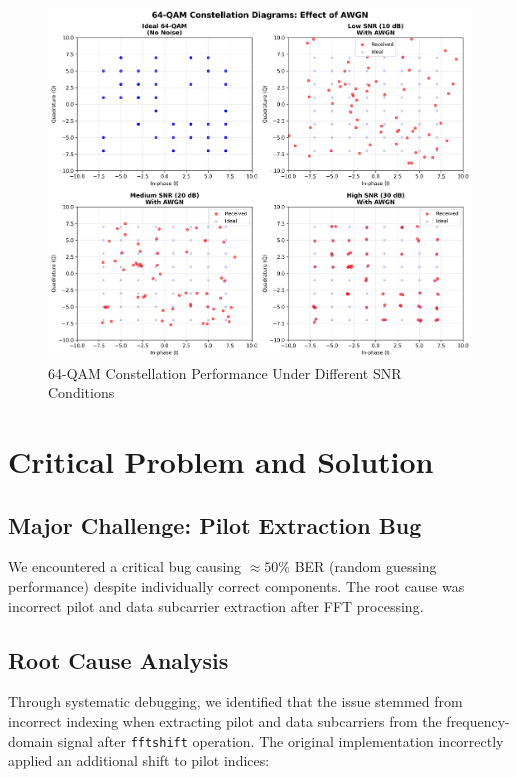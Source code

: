 \documentclass[11pt,a4paper]{article}
\begin{document}
\begin{figure}[H]
    \centering
    \includegraphics[width=\textwidth]{constellation_comparison.png}
    \caption{64-QAM Constellation Performance Under Different SNR Conditions}
    \label{fig:constellation_comparison}
\end{figure}

\section{Critical Problem and Solution}

\subsection{Major Challenge: Pilot Extraction Bug}
We encountered a critical bug causing $\approx 50\%$ BER (random guessing performance) despite individually correct components. The root cause was incorrect pilot and data subcarrier extraction after FFT processing.

\subsection{Root Cause Analysis}
Through systematic debugging, we identified that the issue stemmed from incorrect indexing when extracting pilot and data subcarriers from the frequency-domain signal after \texttt{fftshift} operation. The original implementation incorrectly applied an additional shift to pilot indices:
\end{document}
